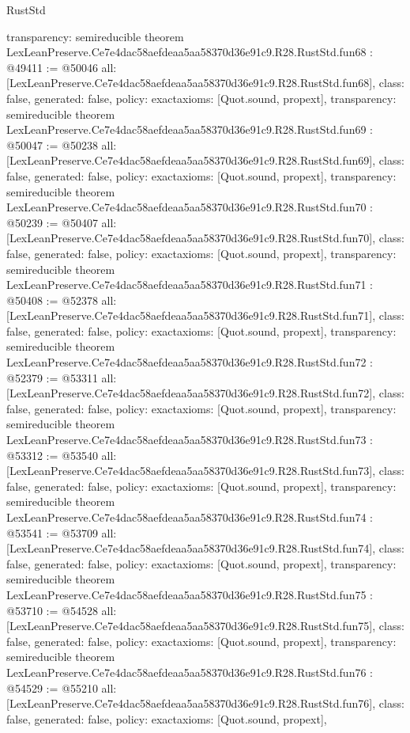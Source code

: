 \begin{lexlean}{RustStd}
\begin{coremodule}
{  transparency: semireducible
}
theorem LexLeanPreserve.Ce7e4dac58aefdeaa5aa58370d36e91c9.R28.RustStd.fun68 : @49411 := @50046 {
  all: [LexLeanPreserve.Ce7e4dac58aefdeaa5aa58370d36e91c9.R28.RustStd.fun68],
  class: false,
  generated: false,
  policy: exact{axioms: [Quot.sound, propext]},
  transparency: semireducible
}
theorem LexLeanPreserve.Ce7e4dac58aefdeaa5aa58370d36e91c9.R28.RustStd.fun69 : @50047 := @50238 {
  all: [LexLeanPreserve.Ce7e4dac58aefdeaa5aa58370d36e91c9.R28.RustStd.fun69],
  class: false,
  generated: false,
  policy: exact{axioms: [Quot.sound, propext]},
  transparency: semireducible
}
theorem LexLeanPreserve.Ce7e4dac58aefdeaa5aa58370d36e91c9.R28.RustStd.fun70 : @50239 := @50407 {
  all: [LexLeanPreserve.Ce7e4dac58aefdeaa5aa58370d36e91c9.R28.RustStd.fun70],
  class: false,
  generated: false,
  policy: exact{axioms: [Quot.sound, propext]},
  transparency: semireducible
}
theorem LexLeanPreserve.Ce7e4dac58aefdeaa5aa58370d36e91c9.R28.RustStd.fun71 : @50408 := @52378 {
  all: [LexLeanPreserve.Ce7e4dac58aefdeaa5aa58370d36e91c9.R28.RustStd.fun71],
  class: false,
  generated: false,
  policy: exact{axioms: [Quot.sound, propext]},
  transparency: semireducible
}
theorem LexLeanPreserve.Ce7e4dac58aefdeaa5aa58370d36e91c9.R28.RustStd.fun72 : @52379 := @53311 {
  all: [LexLeanPreserve.Ce7e4dac58aefdeaa5aa58370d36e91c9.R28.RustStd.fun72],
  class: false,
  generated: false,
  policy: exact{axioms: [Quot.sound, propext]},
  transparency: semireducible
}
theorem LexLeanPreserve.Ce7e4dac58aefdeaa5aa58370d36e91c9.R28.RustStd.fun73 : @53312 := @53540 {
  all: [LexLeanPreserve.Ce7e4dac58aefdeaa5aa58370d36e91c9.R28.RustStd.fun73],
  class: false,
  generated: false,
  policy: exact{axioms: [Quot.sound, propext]},
  transparency: semireducible
}
theorem LexLeanPreserve.Ce7e4dac58aefdeaa5aa58370d36e91c9.R28.RustStd.fun74 : @53541 := @53709 {
  all: [LexLeanPreserve.Ce7e4dac58aefdeaa5aa58370d36e91c9.R28.RustStd.fun74],
  class: false,
  generated: false,
  policy: exact{axioms: [Quot.sound, propext]},
  transparency: semireducible
}
theorem LexLeanPreserve.Ce7e4dac58aefdeaa5aa58370d36e91c9.R28.RustStd.fun75 : @53710 := @54528 {
  all: [LexLeanPreserve.Ce7e4dac58aefdeaa5aa58370d36e91c9.R28.RustStd.fun75],
  class: false,
  generated: false,
  policy: exact{axioms: [Quot.sound, propext]},
  transparency: semireducible
}
theorem LexLeanPreserve.Ce7e4dac58aefdeaa5aa58370d36e91c9.R28.RustStd.fun76 : @54529 := @55210 {
  all: [LexLeanPreserve.Ce7e4dac58aefdeaa5aa58370d36e91c9.R28.RustStd.fun76],
  class: false,
  generated: false,
  policy: exact{axioms: [Quot.sound, propext]},
}
\end{coremodule}
\end{lexlean}

